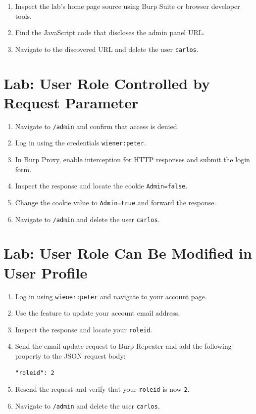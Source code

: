 \documentclass[11pt,a4paper]{article}
\begin{document}
\begin{enumerate}
    \item Inspect the lab's home page source using Burp Suite or browser developer tools.
    \item Find the JavaScript code that discloses the admin panel URL.
    \item Navigate to the discovered URL and delete the user \texttt{carlos}.
\end{enumerate}

\section{Lab: User Role Controlled by Request Parameter}
\vspace{0.3cm}

\begin{enumerate}
    \item Navigate to \texttt{/admin} and confirm that access is denied.
    \item Log in using the credentials \texttt{wiener:peter}.
    \item In Burp Proxy, enable interception for HTTP responses and submit the login form.
    \item Inspect the response and locate the cookie \texttt{Admin=false}.
    \item Change the cookie value to \texttt{Admin=true} and forward the response.
    \item Navigate to \texttt{/admin} and delete the user \texttt{carlos}.
\end{enumerate}

\section{Lab: User Role Can Be Modified in User Profile}
\vspace{0.3cm}

\begin{enumerate}
    \item Log in using \texttt{wiener:peter} and navigate to your account page.
    \item Use the feature to update your account email address.
    \item Inspect the response and locate your \texttt{roleid}.
    \item Send the email update request to Burp Repeater and add the following property to the JSON request body:

          \begin{lstlisting}
"roleid": 2
\end{lstlisting}

    \item Resend the request and verify that your \texttt{roleid} is now \texttt{2}.
    \item Navigate to \texttt{/admin} and delete the user \texttt{carlos}.
\end{enumerate}
\end{document}
